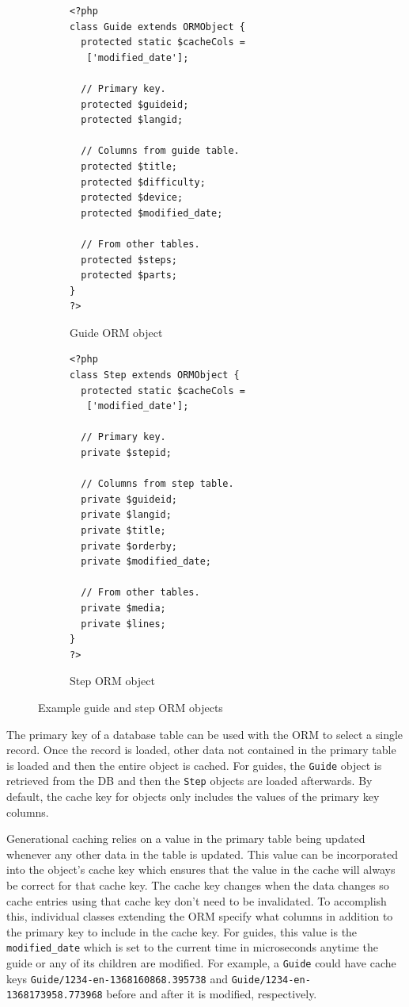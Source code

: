 \documentclass[12pt]{ucthesis}
\begin{document}
\begin{figure}[h]
\begin{subfigure}[h]{0.5\textwidth}
\begin{ssp}
\begin{verbatim}
<?php
class Guide extends ORMObject {
  protected static $cacheCols =
   ['modified_date'];

  // Primary key.
  protected $guideid;
  protected $langid;

  // Columns from guide table.
  protected $title;
  protected $difficulty;
  protected $device;
  protected $modified_date;

  // From other tables.
  protected $steps;
  protected $parts;
}
?>
\end{verbatim}
\caption{Guide ORM object}
\label{fig:guideORMTable}
\end{ssp}
\end{subfigure}
\begin{subfigure}[h]{0.5\textwidth}
\begin{ssp}
\begin{verbatim}
<?php
class Step extends ORMObject {
  protected static $cacheCols =
   ['modified_date'];

  // Primary key.
  private $stepid;

  // Columns from step table.
  private $guideid;
  private $langid;
  private $title;
  private $orderby;
  private $modified_date;

  // From other tables.
  private $media;
  private $lines;
}
?>
\end{verbatim}
\caption{Step ORM object}
\label{fig:stepORMObject}
\end{ssp}
\end{subfigure}
\caption{Example guide and step ORM objects}
\label{fig:cachingExample}
\end{figure}

The primary key of a database table can be used with the ORM to select a single record.
Once the record is loaded, other data not contained in the primary table is loaded and then the entire object is cached.
For guides, the {\tt Guide} object is retrieved from the DB and then the {\tt Step} objects are loaded afterwards.
By default, the cache key for objects only includes the values of the primary key columns.

Generational caching relies on a value in the primary table being updated whenever any other data in the table is updated.
This value can be incorporated into the object's cache key which ensures that the value in the cache will always be correct for that cache key.
The cache key changes when the data changes so cache entries using that cache key don't need to be invalidated.
To accomplish this, individual classes extending the ORM specify what columns in addition to the primary key to include in the cache key.
For guides, this value is the {\tt modified\_date} which is set to the current time in microseconds anytime the guide or any of its children are modified.
For example, a {\tt Guide} could have cache keys {\tt Guide/1234-en-1368160868.395738} and {\tt Guide/1234-en-1368173958.773968} before and after it is modified, respectively.
\end{document}
